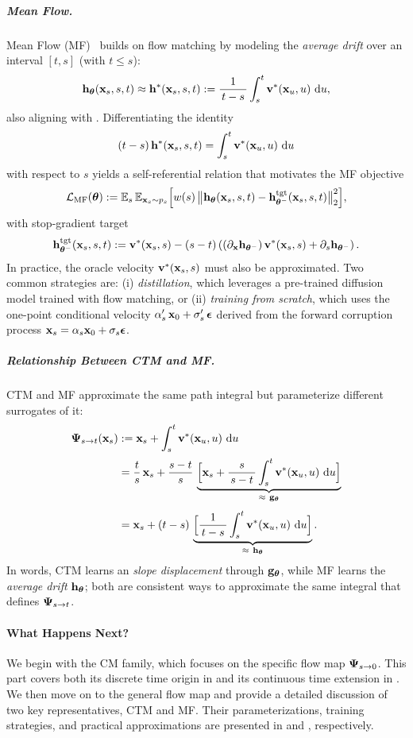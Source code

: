 \subparagraph{Mean Flow.}
Mean Flow (MF)~\citep{geng2025mean} builds on flow matching by modeling the \emph{average drift} over an interval $[t,s]$ (with $t\le s$):
\[
{\mathbf{h}}_{{\bm{\theta}}}({\mathbf{x}}_s,s,t)
 \approx 
{\mathbf{h}}^*({\mathbf{x}}_s,s,t)
:= \frac{1}{\,t-s\,}\int_s^t {\mathbf{v}}^*({\mathbf{x}}_u,u)\,\mathop{}\!\mathrm{d} u,
\]
also aligning with .
Differentiating the identity
\[
(t-s)\,{\mathbf{h}}^*({\mathbf{x}}_s,s,t)  =  \int_s^t {\mathbf{v}}^*({\mathbf{x}}_u,u)\,\mathop{}\!\mathrm{d} u
\]
with respect to $s$ yields a self-referential relation that motivates the MF objective
\[
\mathcal{L}_{\mathrm{MF}}({\bm{\theta}})
:= \mathbb{E}_s\,\mathbb{E}_{{\mathbf{x}}_s\sim p_s} \Big[w(s)\,\big\|
{\mathbf{h}}_{{\bm{\theta}}}({\mathbf{x}}_s,s,t)-{\mathbf{h}}_{{\bm{\theta}}^-}^{\mathrm{tgt}}({\mathbf{x}}_s,s,t)
\big\|_2^2\Big],
\]
with stop-gradient target
\[
{\mathbf{h}}_{{\bm{\theta}}^-}^{\mathrm{tgt}}({\mathbf{x}}_s,s,t)
:= {\mathbf{v}}^*({\mathbf{x}}_s,s)  -  (s-t) \left((\partial_{\mathbf{x}} {\mathbf{h}}_{{\bm{\theta}}^-})\,{\mathbf{v}}^*({\mathbf{x}}_s,s) + \partial_s {\mathbf{h}}_{{\bm{\theta}}^-}\right).
\]
In practice, the oracle velocity ${\mathbf{v}}^*({\mathbf{x}}_s,s)$ must also be approximated.
Two common strategies are: (i) \emph{distillation}, which leverages a
pre-trained diffusion model trained with flow matching, or (ii) \emph{training
from scratch}, which uses the one-point conditional velocity
$\alpha'_s\,{\mathbf{x}}_0+\sigma'_s\,{\bm{\epsilon}}$ derived from the forward corruption process
${\mathbf{x}}_s = \alpha_s {\mathbf{x}}_0+\sigma_s {\bm{\epsilon}}$.



\subparagraph{Relationship Between CTM and MF.}
CTM and MF approximate the same path integral but parameterize different surrogates of it:
\begin{align*}
{\bm{\Psi}}_{s\to t}({\mathbf{x}}_s)
&:= {\mathbf{x}}_s  +  \int_s^t {\mathbf{v}}^*({\mathbf{x}}_u,u)\,\mathop{}\!\mathrm{d} u
\\[2pt]
&= \frac{t}{s}\,{\mathbf{x}}_s
 +  \frac{s-t}{s}\,
\underbrace{\Big[{\mathbf{x}}_s + \frac{s}{\,s-t\,} \int_s^t {\mathbf{v}}^*({\mathbf{x}}_u,u)\,\mathop{}\!\mathrm{d} u\Big]}_{\approx~{\mathbf{g}}_{{\bm{\theta}}} }
\\[4pt]
&= {\mathbf{x}}_s  +  (t-s)\,
\underbrace{\Big[\frac{1}{\,t-s\,} \int_s^t {\mathbf{v}}^*({\mathbf{x}}_u,u)\,\mathop{}\!\mathrm{d} u\Big]}_{\approx~{\mathbf{h}}_{{\bm{\theta}}} }.
\end{align*}
In words, CTM learns an \emph{slope displacement} through ${\mathbf{g}}_{\bm{\theta}}$, while MF learns the \emph{average drift} ${\mathbf{h}}_{\bm{\theta}}$; both are consistent ways to approximate the same integral that defines ${\bm{\Psi}}_{s\to t}$.


\paragraph{What Happens Next?}
We begin with the CM family, which focuses on the specific flow map
${\bm{\Psi}}_{s\to 0}$. This part covers both its discrete time origin in
 and its continuous time extension in
. We then move on to the general flow map and provide a
detailed discussion of two key representatives, CTM and MF. Their
parameterizations, training strategies, and practical approximations are
presented in  and , respectively.

